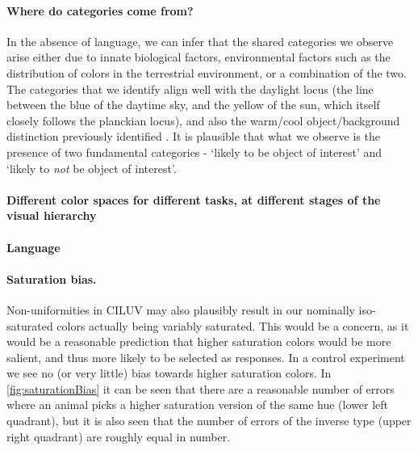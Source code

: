
\paragraph{Where do categories come from?}
In the absence of language, we can infer that the shared categories we observe arise either due to innate biological factors, environmental factors such as the distribution of colors in the terrestrial environment, or a combination of the two.
The categories that we identify align well with the daylight locus (the line between the blue of the daytime sky, and the yellow of the sun, which itself closely follows the planckian locus), and also the warm/cool object/background distinction previously identified \citep{rosenthal_color_2018}. It is plausible that what we observe is the presence of two fundamental categories - `likely to be object of interest' and `likely to \emph{not} be object of interest'. 


\paragraph{Different color spaces for different tasks, at different stages of the visual hierarchy}

\paragraph{Language}


\begin{figure}

\caption{\textbf{}}
\label{fig:SamplingBias}
\end{figure}


\paragraph{Saturation bias.}

Non-uniformities in CILUV may also plausibly result in our nominally iso-saturated colors actually being variably saturated. This would be a concern, as it would be a reasonable prediction that higher saturation colors would be more salient, and thus more likely to be selected as responses. In a control experiment we see no (or very little) bias towards higher saturation colors. In \autoref{fig:saturationBias} it can be seen that there are a reasonable number of errors where an animal picks a higher saturation version of the same hue (lower left quadrant), but it is also seen that the number of errors of the inverse type (upper right quadrant) are roughly equal in number.



